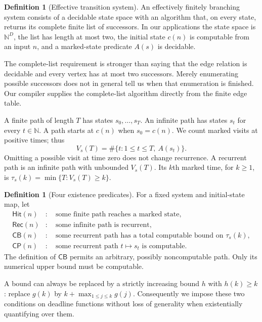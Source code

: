 \documentclass[11pt,letterpaper]{article}
\theoremstyle{definition}
\newtheorem{definition}[theorem]{Definition}
\theoremstyle{remark}
\newcommand{\N}{\mathbb N}
\newcommand{\CP}{\mathsf{CP}}
\newcommand{\CB}{\mathsf{CB}}
\newcommand{\REC}{\mathsf{Rec}}
\newcommand{\HIT}{\mathsf{Hit}}
\newcommand{\1}{\mathbf 1}
\begin{document}
\begin{definition}[Effective transition system]
An effectively finitely branching system consists of a decidable state space
with an algorithm that, on every state, returns its complete finite list of
successors. In our applications the state space is $\N^D$, the list has length
at most two, the initial state $c(n)$ is computable from an input $n$, and a
marked-state predicate $A(s)$ is decidable.
\end{definition}

The complete-list requirement is stronger than saying that the edge relation
is decidable and every vertex has at most two successors. Merely enumerating
possible successors does not in general tell us when that enumeration is
finished. Our compiler supplies the complete-list algorithm directly from
the finite edge table.

A finite path of length $T$ has states $s_0,\ldots,s_T$. An infinite path has
states $s_t$ for every $t\in\N$. A path starts at $c(n)$ when $s_0=c(n)$.
We count marked visits at positive times; thus
\begin{equation}\label{lbh:qd:eq:visits}
 V_s(T)=\#\{t:1\leq t\leq T,\ A(s_t)\}.
\end{equation}
Omitting a possible visit at time zero does not change recurrence. A recurrent
path is an infinite path with unbounded $V_s(T)$. Its $k$th marked time, for
$k\geq1$, is $\tau_s(k)=\min\{T:V_s(T)\geq k\}$.

\begin{definition}[Four existence predicates]
For a fixed system and initial-state map, let
\begin{align*}
 \HIT(n)&:\quad \text{some finite path reaches a marked state},\\
 \REC(n)&:\quad \text{some infinite path is recurrent},\\
 \CB(n)&:\quad \text{some recurrent path has a total computable bound on }
                         \tau_s(k),\\
 \CP(n)&:\quad \text{some recurrent path }t\mapsto s_t\text{ is computable}.
\end{align*}
The definition of $\CB$ permits an arbitrary, possibly noncomputable path.
Only its numerical upper bound must be computable.
\end{definition}

A bound can always be replaced by a strictly increasing bound $h$ with
$h(k)\geq k$: replace $g(k)$ by $k+\max_{1\leq j\leq k}g(j)$. Consequently
we impose these two conditions on deadline functions without loss of
generality when existentially quantifying over them.
\end{document}
